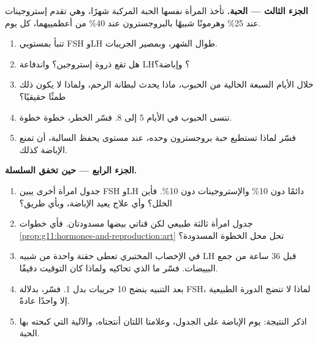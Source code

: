 \begin{problem}
\medskip
\noindent\textbf{الجزء الثالث --- الحبة.}
تأخذ المرأة نفسها الحبة المركبة شهرًا، وهي تقدم إستروجينات عند 25\%
وهرمونًا شبيهًا بالبروجسترون عند 40\% من أعظمييهما، كل يوم.
\begin{enumerate}[resume]
  \item تنبأ بمستويي FSH وLH طوال الشهر، وبمصير الجريبات.
  \item هل تقع ذروة إستروجين؟ واندفاعة LH؟ وإباضة؟
  \item خلال الأيام السبعة الخالية من الحبوب، ماذا يحدث لبطانة الرحم،
        ولماذا لا يكون ذلك طمثًا حقيقيًا؟
  \item تنسى الحبوب في الأيام 5 إلى 8. فسّر الخطر، خطوة خطوة.
  \item فسّر لماذا تستطيع حبة بروجسترون وحده، عند مستوى يحفظ  السالبة، أن تمنع الإباضة كذلك.
\end{enumerate}

\medskip
\noindent\textbf{الجزء الرابع --- حين تخفق السلسلة.}
\begin{enumerate}[resume]
  \item جدول امرأة أخرى يبين FSH وLH دائمًا دون 10\% والإستروجينات دون
        10\%. فأين الخلل؟ وأي علاج يعيد الإباضة، وبأي طريق؟
  \item جدول امرأة ثالثة طبيعي لكن قناتي بيضها مسدودتان. فأي خطوات
        \cref{prop:g11:hormones-and-reproduction:art} تحل محل الخطوة
        المسدودة؟
  \item في الإخصاب المختبري تعطى حقنة واحدة من  شبيه  LH قبل 36
        ساعة من جمع البييضات. فسّر ما الذي تحاكيه ولماذا كان التوقيت
        دقيقًا.
  \item بعد التنبيه ينضج 10 جريبات بدل 1. فسّر، بدلالة FSH، لماذا لا تنضج
        الدورة الطبيعية إلا واحدًا عادةً.
  \item اذكر النتيجة: يوم الإباضة على الجدول، وعلامتا 
        اللتان أنتجتاه، والآلية التي كبحته بها الحبة.
\end{enumerate}
\end{problem}
